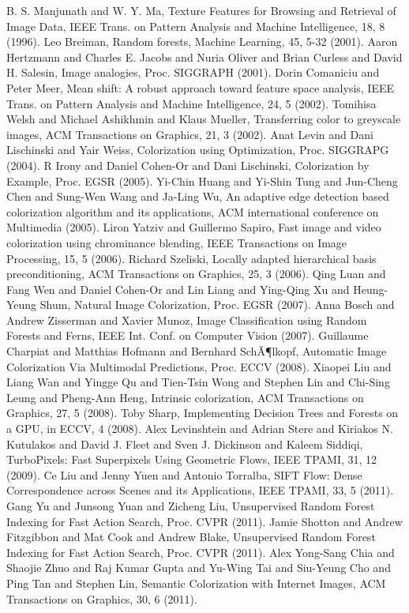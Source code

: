 \documentclass[twocolumn]{svjour3}          %
\begin{document}
\begin{thebibliography}{}
B. S. Manjunath and W. Y. Ma, Texture Features for Browsing and Retrieval of Image Data, IEEE Trans. on Pattern Analysis and Machine Intelligence, 18, 8 (1996).
Leo Breiman, Random forests, Machine Learning, 45, 5-32 (2001).
Aaron Hertzmann and Charles E. Jacobs and  Nuria Oliver and Brian Curless and David H. Salesin, Image analogies, Proc. SIGGRAPH (2001).
Dorin Comaniciu and Peter Meer, Mean shift: A robust approach toward feature space analysis, IEEE Trans. on Pattern Analysis and Machine Intelligence, 24, 5 (2002).
Tomihisa Welsh and Michael Ashikhmin and Klaus Mueller, Transferring color to greyscale images, ACM Transactions on Graphics, 21, 3 (2002).
Anat Levin and  Dani Lischinski and Yair Weiss, Colorization using Optimization, Proc. SIGGRAPG (2004).
R Irony  and  Daniel Cohen-Or and Dani Lischinski, Colorization by Example, Proc. EGSR (2005).
Yi-Chin Huang and Yi-Shin Tung and Jun-Cheng Chen and Sung-Wen Wang and Ja-Ling Wu, An adaptive edge detection based colorization algorithm and its applications, ACM international conference on Multimedia (2005).
Liron Yatziv and Guillermo Sapiro, Fast image and video colorization using chrominance blending, IEEE Transactions on Image Processing, 15, 5 (2006).
Richard Szeliski, Locally adapted hierarchical basis preconditioning, ACM Transactions on Graphics, 25, 3 (2006).
Qing Luan  and  Fang Wen and Daniel Cohen-Or and Lin Liang and Ying-Qing Xu and Heung-Yeung Shum, Natural Image Colorization, Proc. EGSR (2007).
Anna Bosch and Andrew Zisserman and Xavier Munoz, Image Classification using Random Forests and Ferns, IEEE Int. Conf. on Computer Vision (2007).
Guillaume Charpiat and Matthias Hofmann and Bernhard SchÃ¶lkopf, Automatic Image Colorization Via Multimodal Predictions, Proc. ECCV (2008).
Xiaopei Liu and Liang Wan and Yingge Qu and Tien-Tsin Wong and Stephen Lin and Chi-Sing Leung and Pheng-Ann Heng, Intrinsic colorization, ACM Transactions on Graphics, 27, 5 (2008).
Toby Sharp, Implementing Decision Trees and Forests on a GPU, in ECCV, 4 (2008).
Alex Levinshtein and Adrian Stere and Kiriakos N. Kutulakos and David J. Fleet and Sven J. Dickinson and Kaleem Siddiqi, TurboPixels: Fast Superpixels Using Geometric Flows, IEEE TPAMI, 31, 12 (2009).
Ce Liu and Jenny Yuen and Antonio Torralba, SIFT Flow: Dense Correspondence across Scenes and its Applications, IEEE TPAMI, 33, 5 (2011).
Gang Yu and Junsong Yuan and Zicheng Liu, Unsupervised Random Forest Indexing for Fast Action Search, Proc. CVPR (2011).
Jamie Shotton and Andrew Fitzgibbon and Mat Cook and Andrew Blake, Unsupervised Random Forest Indexing for Fast Action Search, Proc. CVPR (2011).
Alex Yong-Sang Chia and Shaojie Zhuo and Raj Kumar Gupta and Yu-Wing Tai and Siu-Yeung Cho and Ping Tan and Stephen Lin, Semantic Colorization with Internet Images, ACM Transactions on Graphics, 30, 6 (2011).
\end{thebibliography}
\end{document}
